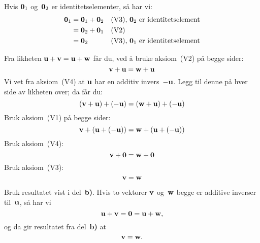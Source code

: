 \begin{losning}
\begin{punkt}
Hvis $\mathbf{0}_1$ og~$\mathbf{0}_2$ er identitetselementer, så har vi:
\begin{align*}
\mathbf{0}_1
 &= \mathbf{0}_1 + \mathbf{0}_2 &&\text{(V3), $\mathbf{0}_2$ er identitetselement} \\
 &= \mathbf{0}_2 + \mathbf{0}_1 &&\text{(V2)} \\
 &= \mathbf{0}_2           &&\text{(V3), $\mathbf{0}_1$ er identitetselement}
\end{align*}
\end{punkt}
\begin{punkt}
Fra likheten $\mathbf{u} + \mathbf{v} = \mathbf{u} + \mathbf{w}$ får du, ved å bruke
aksiom~(V2) på begge sider:
\[
\mathbf{v} + \mathbf{u} = \mathbf{w} + \mathbf{u}
\]
Vi vet fra aksiom~(V4) at $\mathbf{u}$ har en additiv invers~$-\mathbf{u}$.
Legg til denne på hver side av likheten over; da får du:
\[
(\mathbf{v} + \mathbf{u}) + (-\mathbf{u}) = (\mathbf{w} + \mathbf{u}) + (-\mathbf{u})
\]
Bruk aksiom~(V1) på begge sider:
\[
\mathbf{v} + (\mathbf{u} + (-\mathbf{u})) = \mathbf{w} + (\mathbf{u} + (-\mathbf{u}))
\]
Bruk aksiom~(V4):
\[
\mathbf{v} + \mathbf{0} = \mathbf{w} + \mathbf{0}
\]
Bruk aksiom~(V3):
\[
\mathbf{v} = \mathbf{w}
\]
\end{punkt}
\begin{punkt}
Bruk resultatet vist i del~\textbf{b)}.  Hvis to vektorer $\mathbf{v}$
og~$\mathbf{w}$ begge er additive inverser til~$\mathbf{u}$, så har vi
\[
\mathbf{u} + \mathbf{v} = \mathbf{0} = \mathbf{u} + \mathbf{w},
\]
og da gir resultatet fra del~\textbf{b)} at
\[
\mathbf{v} = \mathbf{w}.
\]
\end{punkt}
\end{losning}


